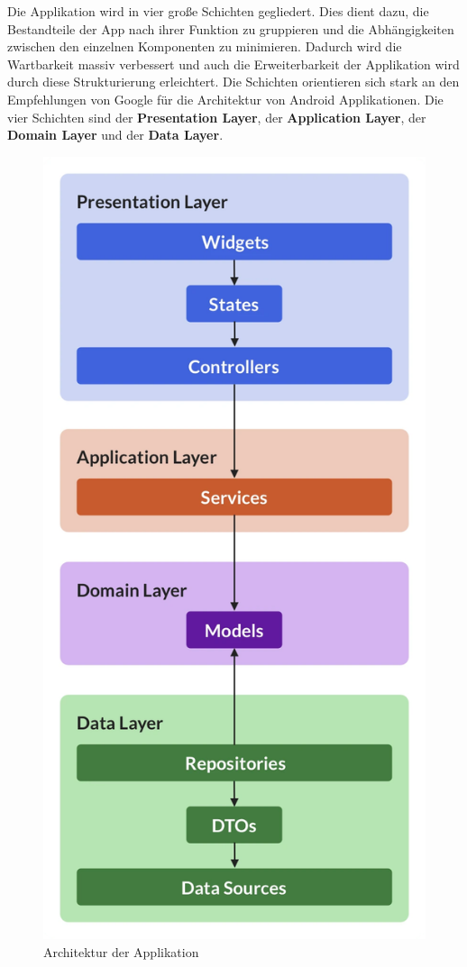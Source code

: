 \documentclass[parskip=full]{scrartcl}
\begin{document}
Die Applikation wird in vier große Schichten gegliedert. Dies dient dazu, die Bestandteile der App nach ihrer Funktion zu gruppieren und die Abhängigkeiten zwischen den einzelnen Komponenten zu minimieren. Dadurch wird die Wartbarkeit massiv verbessert und auch die Erweiterbarkeit der Applikation wird durch diese Strukturierung erleichtert. Die Schichten orientieren sich stark an den Empfehlungen von Google für die Architektur von Android Applikationen. Die vier Schichten sind der \textbf{Presentation Layer}, der \textbf{Application Layer}, der \textbf{Domain Layer} und der \textbf{Data Layer}. 
\begin{figure}[htp]
    \centering
    \includegraphics[height = 0.4\textheight]{images/architecture/architecture.png}
    \caption{Architektur der Applikation}
    \label{fig:struktur}
\end{figure}
\end{document}
